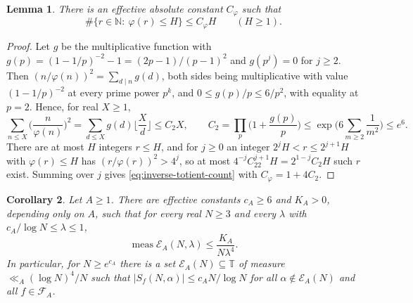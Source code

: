 \documentclass[11pt]{amsart}
\numberwithin{equation}{section}
\numberwithin{figure}{section}
\newtheorem{lemma}{Lemma}[section]
\newtheorem{corollary}[lemma]{Corollary}
\theoremstyle{definition}
\newcommand{\N}{\mathbb{N}}
\newcommand{\FA}{\mathcal F_A}
\begin{document}
\begin{lemma}\label{lem:inverse-totient}
There is an effective absolute constant $C_\varphi$ such that
\begin{equation}\label{eq:inverse-totient-count}
 \#\{r\in\N:\ \varphi(r)\le H\}\le C_\varphi H\qquad(H\ge1).
\end{equation}
\end{lemma}

\begin{proof}
Let $g$ be the multiplicative function with
$g(p)=(1-1/p)^{-2}-1=(2p-1)/(p-1)^2$ and $g(p^j)=0$ for $j\ge2$. Then
$(n/\varphi(n))^2=\sum_{d\mid n}g(d)$, both sides being multiplicative
with value $(1-1/p)^{-2}$ at every prime power $p^k$, and
$0\le g(p)/p\le6/p^2$, with equality at $p=2$. Hence, for real
$X\ge1$,
\[
 \sum_{n\le X}\Big(\frac n{\varphi(n)}\Big)^2
 =\sum_{d\le X}g(d)\Big\lfloor\frac Xd\Big\rfloor\le C_2X,
 \qquad
 C_2=\prod_p\Big(1+\frac{g(p)}p\Big)\le\exp\Big(6\sum_{m\ge2}\frac1{m^2}\Big)\le e^6.
\]
There are at most $H$ integers $r\le H$, and for $j\ge0$ an integer
$2^jH<r\le2^{j+1}H$ with $\varphi(r)\le H$ has $(r/\varphi(r))^2>4^j$,
so at most $4^{-j}C_22^{j+1}H=2^{1-j}C_2H$ such $r$ exist. Summing
over $j$ gives \eqref{eq:inverse-totient-count} with
$C_\varphi=1+4C_2$.
\end{proof}

\begin{corollary}\label{cor:simultaneous}
Let $A\ge1$. There are effective constants $c_A\ge6$ and $K_A>0$,
depending only on $A$, such that for every real $N\ge3$ and every
$\lambda$ with $c_A/\log N\le\lambda\le1$,
\begin{equation}\label{eq:exceptional-bound}
 \operatorname{meas}\mathcal E_A(N,\lambda)\le\frac{K_A}{N\lambda^4}.
\end{equation}
In particular, for $N\ge e^{c_A}$ there is a set
$\mathcal E_A(N)\subseteq\mathbb T$ of measure $\ll_A(\log N)^4/N$
such that $|S_f(N,\alpha)|\le c_AN/\log N$ for all
$\alpha\notin\mathcal E_A(N)$ and all $f\in\FA$.
\end{corollary}
\end{document}
